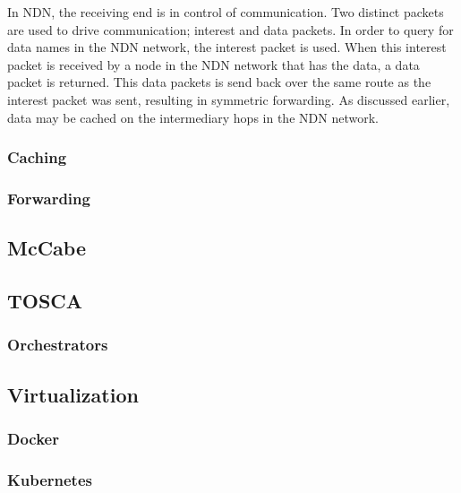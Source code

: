 In NDN, the receiving end is in control of communication. Two distinct packets are used to drive communication; interest and data packets. In order to query for data names in the NDN network, the interest packet is used. When this interest packet is received by a node in the NDN network that has the data, a data packet is returned. This data packets is send back over the same route as the interest packet was sent, resulting in symmetric forwarding. As discussed earlier, data may be cached on the intermediary hops in the NDN network.



\subsubsection{Caching}


\subsubsection{Forwarding}


\subsection{McCabe}
\label{overview-mccabe}


\subsection{TOSCA}

\subsubsection{Orchestrators}

\subsection{Virtualization}
\subsubsection{Docker}

\subsubsection{Kubernetes}
